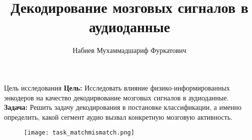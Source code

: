 \documentclass{beamer}
\title[\hbox to 56mm{Декодирование мозговых сигналов}]{Декодирование мозговых сигналов в аудиоданные}
\author[М.\,Ф. Набиев]{Набиев Мухаммадшариф Фуркатович}
\institute{Московский физико-технический институт}
\date{\footnotesize
\par\smallskip\emph{Курс:} Моя первая научная статья\par (практика, В.\,В.~Стрижов)
\par\smallskip\emph{Эксперт:} аспирант П.\,А.~Северилов
\par\bigskip\small 2024}
\begin{document}
\begin{frame}
\thispagestyle{empty}
\maketitle
\end{frame}
\begin{frame}{Цель исследования}
\textbf{Цель:} Исследовать влияние физико-информированных энкодеров на качество декодирвование мозговых сигналов в аудиоданные. \\
\textbf{Задача:} Решить задачу декодирования в постановке классификации, а именно определить, какой сегмент аудио вызвал конкретную мозговую активность.
\begin{figure}
    \centering
    \texttt{[image: task\_matchmismatch.png]}
\end{figure}
\end{frame}
\end{document}
